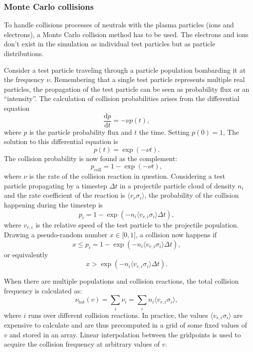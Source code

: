 \documentclass[a4paper,twoside,12pt]{article}
\begin{document}
\subsubsection{Monte Carlo collisions}
To handle collisions processes of neutrals with the plasma particles (ions and electrons), a Monte Carlo collision method has to be used. The electrons and ions don't exist in the simulation as individual test particles but as particle distributions.

Consider a test particle traveling through a particle population bombarding it at the frequency $\nu$. Remembering that a single test particle represents multiple real particles, the propagation of the test particle can be seen as probability flux or an ``intensity''. The calculation of collision probabilities arises from the differential equation
\begin{equation}
    \frac{\mathrm{d}p}{\mathrm{d}t} = -\nu p(t),
\end{equation}
where $p$ is the particle probability flux and $t$ the time. Setting $p(0) = 1$, The solution to this differential equation is
\[
    p(t) = \exp(-\nu t).
\]
The collision probability is now found as the complement:
\begin{equation}
    p_\text{coll} = 1 - \exp(-\nu t),
\end{equation}
where $\nu$ is the rate of the collision reaction in question. Considering a test particle propagating by a timestep $\Delta t$ in a projectile particle cloud of density $n_i$ and the rate coefficient of the reaction is $\langle v_r \sigma_i \rangle$, the probability of the collision happening during the timestep is
\begin{equation}
    p_i = 1 - \exp(-n_i \langle v_{r, i} \sigma_i \rangle \Delta t),
\end{equation}
where $v_{r, i}$ is the relative speed of the test particle to the projectile population. Drawing a pseudo-random number $x \in [0, 1[$, a collision now happens if
\[
    x \leq p_i = 1 - \exp(-n_i \langle v_{r, i} \sigma_i \rangle \Delta t),
\]
or equivalently
\[
    x > \exp(-n_i \langle v_{r, i} \sigma_i \rangle \Delta t).
\]

When there are multiple populations and collision reactions, the total collision frequency is calculated as:
\begin{equation}
    \nu_\text{tot} (v) = \sum\limits_i \nu_i = \sum\limits_i n_i \langle v_{r, i} \sigma_i \rangle,
\end{equation}
where $i$ runs over different collision reactions.
In practice, the values $\langle v_{r, i} \sigma_i \rangle$ are expensive to calculate and are thus precomputed in a grid of some fixed values of $v$ and stored in an array. Linear interpolation between the gridpoints is used to acquire the collision frequency at arbitrary values of $v$.
\end{document}
